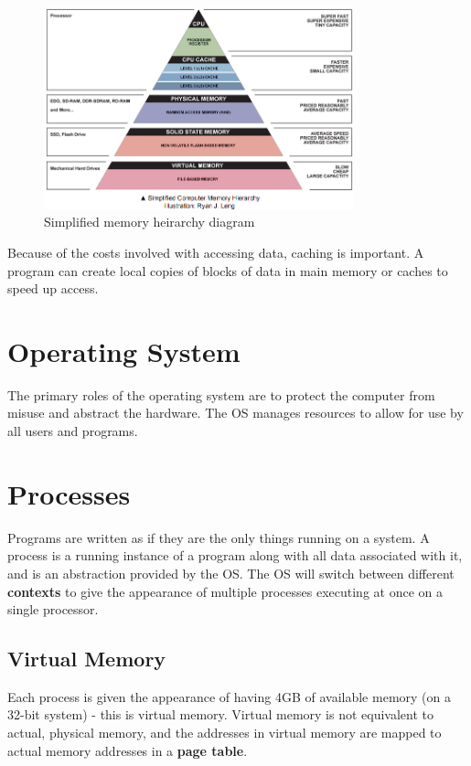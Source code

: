 \documentclass[11pt]{article}
\begin{document}
	\begin{figure}[htb]
		\centering
		\includegraphics[width=0.8\textwidth]{hei.png}
		\caption{Simplified memory heirarchy diagram}
		\label{fig:memory}
	\end{figure}
	
	Because of the costs involved with accessing data, caching is important. A program can create local copies of blocks of data in main memory or caches to speed up access.

\section{Operating System}
	The primary roles of the operating system are to protect the computer from misuse and abstract the hardware. The OS manages resources to allow for use by all users and programs.
		
\section{Processes}
	Programs are written as if they are the only things running on a system. A process is a running instance of a program along with all data associated with it, and is an abstraction provided by the OS. The OS will switch between different \textbf{contexts} to give the appearance of multiple processes executing at once on a single processor.
	
	\subsection{Virtual Memory}
		Each process is given the appearance of having 4GB of available memory (on a 32-bit system) - this is virtual memory. Virtual memory is not equivalent to actual, physical memory, and the addresses in virtual memory are mapped to actual memory addresses in a \textbf{page table}.
		
\end{document}
